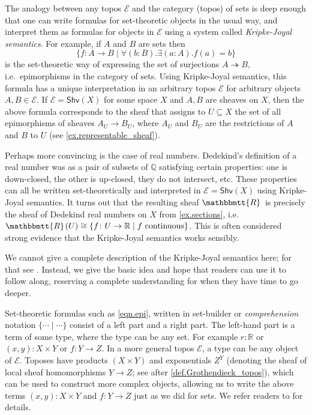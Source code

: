 \documentclass[11pt, oneside, article]{memoir}
\theoremstyle{plain}
\theoremstyle{definition}
\theoremstyle{remark}
\renewcommand{\ss}{\subseteq}
\newcommand{\cat}[1]{\mathcal{#1}}
\newcommand{\Fun}[1]{\mathsf{#1}}
\newcommand{\surj}{\twoheadrightarrow}
\newcommand{\tn}[1]{\textnormal{#1}}
\newcommand{\internal}[1]{\raisebox{-.03ex}{$\mathbbmtt{#1}$}}
\newcommand{\hs}{\hspace{1.1pt}}
\newcommand{\qq}{\mathbb{Q}}
\newcommand{\rr}{\mathbb{R}}
\newcommand{\trr}{\internal{R}\hs}
\newcommand{\shv}{\Fun{Shv}}
\begin{document}
The analogy between any topos $\cat{E}$ and the category (topos) of sets is deep enough that one can write formulas for set-theoretic objects in the usual way, and interpret them as formulas for objects in $\cat{E}$ using a system called \emph{Kripke-Joyal semantics}. For example, if $A$ and $B$ are sets then 
\begin{equation}\label{eqn.epi}
\{f\colon A\to B\mid \forall (b:B).\exists(a:A). f(a)=b\}
\end{equation}
is the set-theoretic way of expressing the set of surjections $A\surj B$, i.e.\ epimorphisms in the category of sets. Using Kripke-Joyal semantics, this formula has a unique interpretation in an arbitrary topos $\cat{E}$ for arbitrary objects $A,B\in\cat{E}$. If $\cat{E}=\shv(X)$ for some space $X$ and $A,B$ are sheaves on $X$, then the above formula corresponds to the sheaf that assigns to $U\ss X$ the set of all epimorphisms of sheaves $A_U\to B_U$, where $A_U$ and $B_U$ are the restrictions of $A$ and $B$ to $U$ (see \cref{ex.representable_sheaf}).

Perhaps more convincing is the case of real numbers. Dedekind's definition of a real number was as a pair of subsets of $\qq$ satisfying certain properties: one is down-closed, the other is up-closed, they do not intersect, etc. These properties can all be written set-theoretically and interpreted in $\cat{E}=\shv(X)$ using Kripke-Joyal semantics. It turns out that the resulting sheaf $\trr$ is precisely the sheaf of Dedekind real numbers on $X$ from \cref{ex.sections}, i.e.\ $\trr(U)\cong\{f\colon U\to\rr\mid f\tn{ continuous}\}$. This is often considered strong evidence that the Kripke-Joyal semantics works sensibly.

We cannot give a complete description of the Kripke-Joyal semantics here; for that see \cite{MacLane.Moerdijk:1992a}. Instead, we give the basic idea and hope that readers can use it to follow along, reserving a complete understanding for when they have time to go deeper.

Set-theoretic formulas such as \eqref{eqn.epi}, written in set-builder or \emph{comprehension} notation $\{\cdots\mid\cdots\}$ consist of a left part and a right part. The left-hand part is a term of some type, where the type can be any set. For example $r:\rr$ or $(x,y): X\times Y$ or $f:Y\to Z$. In a more general topos $\cat{E}$, a type can be any object of $\cat{E}$. Toposes have products $(X\times Y)$ and exponentials $Z^Y$ (denoting the sheaf of local sheaf homomorphisms $Y\to Z$; see after \cref{def.Grothendieck_topos}), which can be used to construct more complex objects, allowing us to write the above terms $(x,y):X\times Y$ and $f:Y\to Z$ just as we did for sets. We refer readers to \cite[Section VI.5]{MacLane.Moerdijk:1992a} for details.
\end{document}
